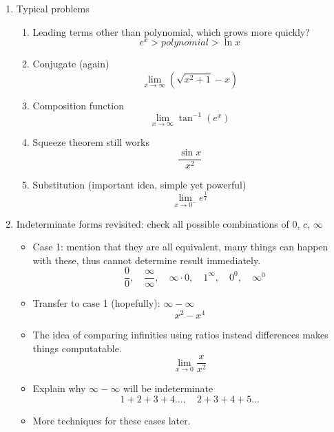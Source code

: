 \documentclass{article}
\begin{document}
\begin{enumerate}
\item Typical problems
\begin{enumerate}
\item Leading terms other than polynomial, which grows more quickly?
$$
e^x>polynomial>\ln x
$$
\item Conjugate (again)
$$
\lim_{x\rightarrow \infty} (\sqrt{x^2+1}-x)
$$
\item Composition function
$$
\lim_{x\rightarrow \infty} \tan^{-1}(e^x)
$$
\item Squeeze theorem still works
$$
\frac{\sin x}{x^2}
$$
\item Substitution (important idea, simple yet powerful)
$$
\lim_{x\rightarrow 0^-}e^{\frac{1}{x}}
$$
\end{enumerate}

\item Indeterminate forms revisited: check all possible combinations of $0$, $c$, $\infty$
\begin{itemize}
\item Case 1: mention that they are all equivalent, many things can happen with these, thus cannot determine result immediately.
$$
\quad \frac{0}{0}, \quad\frac{\infty}{\infty}, \quad \infty\cdot 0,\quad 1^\infty, \quad 0^0, \quad \infty^0
$$ 
\item Transfer to case 1 (hopefully): $\infty-\infty$
$$
x^2-x^4
$$
\item The idea of comparing infinities using ratios instead differences makes things computatable.
$$
\lim_{x\rightarrow 0} \frac{x}{x^2}
$$ 
\item Explain why $\infty-\infty$ will be indeterminate
$$
1+2+3+4...,\quad 2+3+4+5...
$$
\item More techniques for these cases later.
\end{itemize}
\end{enumerate}


\end{document}
